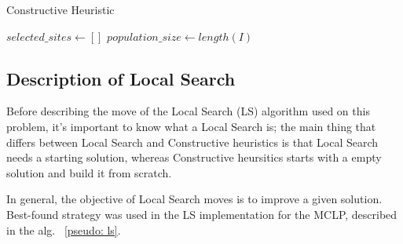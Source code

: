 \documentclass[11pt, a4paper]{article}
\begin{document}
\begin{algorithm}[H]
	\caption{Constructive Heuristic}\label{pseudo: ch}
	\SetAlgoLined
	\DontPrintSemicolon

	\KwResult{}
	$selected\_sites \gets []$\;
	$population\_size \gets length(I)$\;
	\BlankLine
	\BlankLine
	
\end{algorithm}

\subsection{Description of Local Search}
Before describing the move of the Local Search (LS) algorithm used on this problem, it's important to know what a Local Search is; the main thing that differs between Local Search and Constructive heuristics is that Local Search needs a starting solution, whereas Constructive heursitics starts with a empty solution and build it from scratch. 

In general, the objective of Local Search moves is to improve a given solution. Best-found strategy was used in the LS implementation for the MCLP, described in the alg. ~\ref{pseudo: ls}.
\end{document}

